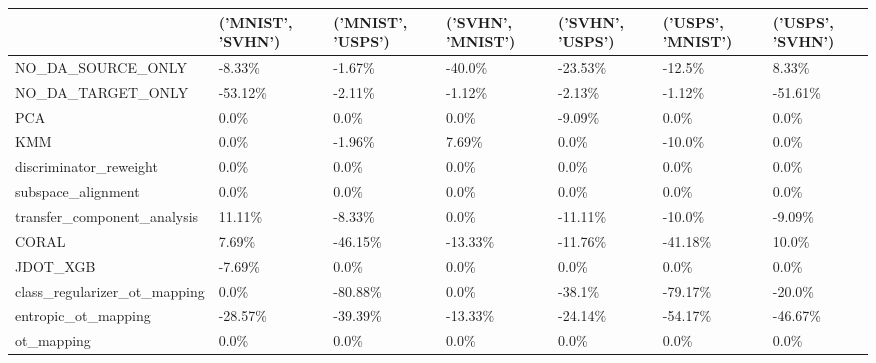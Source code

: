 \begin{tabular}{lllllll}
\hline
                              & ('MNIST', 'SVHN')   & ('MNIST', 'USPS')   & ('SVHN', 'MNIST')   & ('SVHN', 'USPS')   & ('USPS', 'MNIST')   & ('USPS', 'SVHN')   \\
\hline
 NO\_DA\_SOURCE\_ONLY            & -8.33\%              & -1.67\%              & -40.0\%              & -23.53\%            & -12.5\%              & 8.33\%              \\
 NO\_DA\_TARGET\_ONLY            & -53.12\%             & -2.11\%              & -1.12\%              & -2.13\%             & -1.12\%              & -51.61\%            \\
 PCA                          & 0.0\%                & 0.0\%                & 0.0\%                & -9.09\%             & 0.0\%                & 0.0\%               \\
 KMM                          & 0.0\%                & -1.96\%              & 7.69\%               & 0.0\%               & -10.0\%              & 0.0\%               \\
 discriminator\_reweight       & 0.0\%                & 0.0\%                & 0.0\%                & 0.0\%               & 0.0\%                & 0.0\%               \\
 subspace\_alignment           & 0.0\%                & 0.0\%                & 0.0\%                & 0.0\%               & 0.0\%                & 0.0\%               \\
 transfer\_component\_analysis  & 11.11\%              & -8.33\%              & 0.0\%                & -11.11\%            & -10.0\%              & -9.09\%             \\
 CORAL                        & 7.69\%               & -46.15\%             & -13.33\%             & -11.76\%            & -41.18\%             & 10.0\%              \\
 JDOT\_XGB                     & -7.69\%              & 0.0\%                & 0.0\%                & 0.0\%               & 0.0\%                & 0.0\%               \\
 class\_regularizer\_ot\_mapping & 0.0\%                & -80.88\%             & 0.0\%                & -38.1\%             & -79.17\%             & -20.0\%             \\
 entropic\_ot\_mapping          & -28.57\%             & -39.39\%             & -13.33\%             & -24.14\%            & -54.17\%             & -46.67\%            \\
 ot\_mapping                   & 0.0\%                & 0.0\%                & 0.0\%                & 0.0\%               & 0.0\%                & 0.0\%               \\
\hline
\end{tabular}